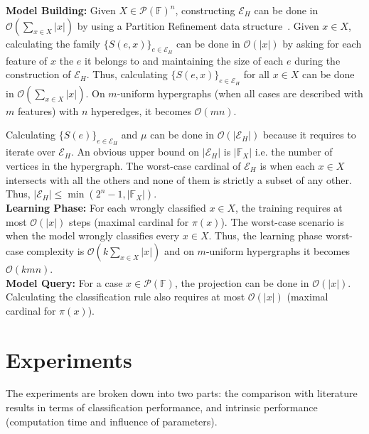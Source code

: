 \documentclass[sigconf,edbt]{acmart-edbt-workshops}
\begin{document}
{\bf Model Building:} Given $X \in \mathcal P({\mathbb F})^n$, constructing $\mathcal{E}_H$ can be done in $\mathcal{O}(\underset{x \in X}{\sum}|x|)$ by using a Partition Refinement data structure~\cite{Paige:1987:TPR:37185.37186}. Given $x \in X$, calculating the family $\{S(e, x)\}_{e \in \mathcal{E}_H}$ can be done in $\mathcal{O}(|x|)$ by asking for each feature of $x$ the $e$ it belongs to and maintaining the size of each $e$ during the construction of $\mathcal{E}_H$. Thus, calculating $\{S(e, x)\}_{e \in \mathcal{E}_H}$ for all $x \in X$ can be done in $\mathcal{O}(\underset{x \in X}{\sum}|x|)$. On $m$-uniform hypergraphs (when all cases are described with $m$ features) with $n$ hyperedges, it becomes $\mathcal{O}(mn)$. 

Calculating $\{S(e)\}_{e \in \mathcal{E}_H}$ and $\mu$ can be done in $\mathcal{O}(|\mathcal{E}_H|)$ because it requires to iterate over $\mathcal{E}_H$. An obvious upper bound on $|\mathcal{E}_H|$ is $|\mathbb{F}_X|$ i.e. the number of vertices in the hypergraph. The worst-case cardinal of $\mathcal{E}_H$ is when each $x \in X$ intersects with all the others and none of them is strictly a subset of any other. Thus, $|\mathcal{E}_H| \leq \min(2^n -1, |\mathbb{F}_X|)$.\\

\noindent
{\bf Learning Phase:} For each wrongly classified $x \in X$, the training requires at most $\mathcal{O}(|x|)$ steps (maximal cardinal for $\pi(x)$). The worst-case scenario is when the model wrongly classifies every $x \in X$. Thus, the learning phase worst-case complexity is $\mathcal{O}(k \underset{x \in X}{\sum}|x|)$ and on $m$-uniform hypergraphs it becomes $\mathcal{O}(k m n)$.\\

\noindent
{\bf Model Query:} For a case $x \in \mathcal P({\mathbb F})$, the projection can be done in $\mathcal{O}(|x|)$. Calculating the classification rule also requires at most $\mathcal{O}(|x|)$ (maximal cardinal for $\pi(x)$).


\section{Experiments}
\label{sec:experiments}

The experiments are broken down into two parts: the comparison with literature results in terms of classification performance, and intrinsic performance (computation time and influence of parameters).
\end{document}
